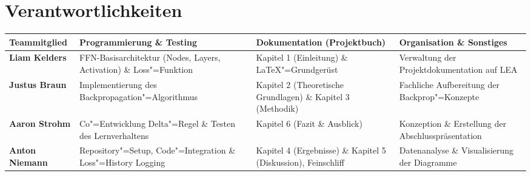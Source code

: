 \section*{Verantwortlichkeiten}

\begin{table}[htbp]
	\centering
	\renewcommand{\arraystretch}{1.45}
	\begin{tabular}{@{}>{\raggedright\arraybackslash}p{2.5cm}
		>{\raggedright\arraybackslash}p{4.1cm}
		>{\raggedright\arraybackslash}p{4.3cm}
		>{\raggedright\arraybackslash}p{3.3cm}@{}}
		\toprule
		\textbf{Teammitglied}  & \textbf{Programmierung \& Testing}                                 & \textbf{Dokumentation (Projektbuch)}                          & \textbf{Organisation \& Sonstiges}                 \\
		\midrule
		\textbf{Liam Kelders}  & FFN-Basisarchitektur (Nodes, Layers, Activation) \& Loss"=Funktion & Kapitel 1 (Einleitung) \& LaTeX"=Grundgerüst                  & Verwaltung der Projektdokumentation auf LEA        \\
		\addlinespace

		\textbf{Justus Braun}  & Implementierung des Backpropagation"=Algorithmus                   & Kapitel 2 (Theoretische Grundlagen) \& Kapitel 3 (Methodik)   & Fachliche Aufbereitung der Backprop"=Konzepte      \\
		\addlinespace

		\textbf{Aaron Strohm}  & Co"=Entwicklung Delta"=Regel \& Testen des Lernverhaltens          & Kapitel 6 (Fazit \& Ausblick)                                 & Konzeption \& Erstellung der Abschlusspräsentation \\
		\addlinespace

		\textbf{Anton Niemann} & Repository"=Setup, Code"=Integration \& Loss"=History Logging      & Kapitel 4 (Ergebnisse) \& Kapitel 5 (Diskussion), Feinschliff & Datenanalyse \& Visualisierung der Diagramme       \\
		\bottomrule
	\end{tabular}
\end{table}

\clearpage
